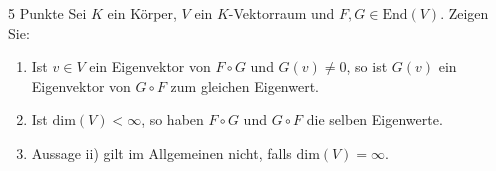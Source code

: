 \documentclass{problemset}
\author{Michael van Straten}
\begin{document}
\maketitle

\begin{problem}{5 Punkte}
Sei $K$ ein Körper, $V$ ein $K$-Vektorraum und $F, G \in \text{End}(V)$. Zeigen Sie:
\begin{enumerate}
    \item Ist $v \in V$ ein Eigenvektor von $F \circ G$ und $G(v) \neq 0$, so
          ist $G(v)$ ein Eigenvektor von $G \circ F$ zum gleichen Eigenwert.
    \item Ist $\text{dim}(V) < \infty$, so haben $F \circ G$ und $G \circ F$
          die selben Eigenwerte.
    \item Aussage ii) gilt im Allgemeinen nicht, falls $\text{dim}(V) =
          \infty$.
\end{enumerate}
\end{problem}
\end{document}
